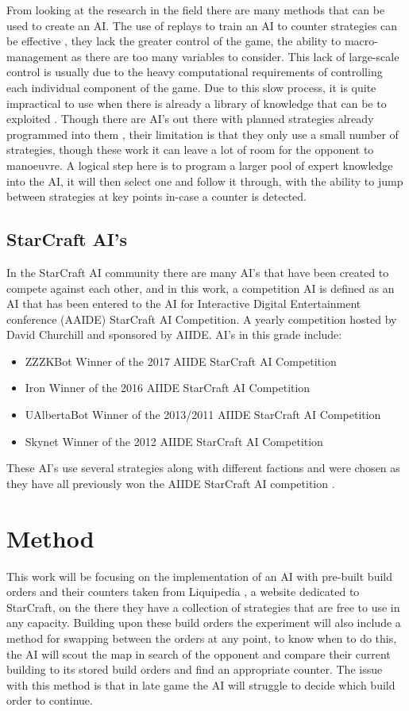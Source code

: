 \documentclass[journal]{IEEEtran}
\begin{document}
From looking at the research in the field there are many methods that can be used to create an AI. The use of replays to train an AI to counter strategies can be effective \cite{Bayesian}, they lack the greater control of the game, the ability to macro-management as there are too many variables to consider. This lack of large-scale control is usually due to the heavy computational requirements of controlling each individual component of the game.  Due to this slow process, it is quite impractical to use when there is already a library of knowledge that can be to exploited \cite{Liquid}. Though there are AI's out there with planned strategies already programmed into them \cite{ZZZK,Fuzzy}, their limitation is that they only use a small number of strategies, though these work it can leave a lot of room for the opponent to manoeuvre. A logical step here is to program a larger pool of expert knowledge into the AI, it will then select one and follow it through, with the ability to jump between strategies at key points in-case a counter is detected. 

\subsection{StarCraft AI's}
In the StarCraft AI community there are many AI's that have been created to compete against each other, and in this work, a competition AI is defined as an AI that has been entered to the AI for Interactive Digital Entertainment conference (AAIDE) StarCraft AI Competition. A yearly competition hosted by David Churchill and sponsored by AIIDE. AI's in this grade include:
\begin{itemize}
\item ZZZKBot Winner of the 2017 AIIDE StarCraft AI Competition \cite{ZZZK}
\item Iron Winner of the 2016 AIIDE StarCraft AI Competition \cite{Iron}
\item UAlbertaBot Winner of the 2013/2011 AIIDE StarCraft AI Competition \cite{UAlberta}
\item Skynet Winner of the 2012 AIIDE StarCraft AI Competition \cite{Skynet}
\end{itemize}

These AI's use several strategies along with different factions and were chosen as they have all previously won the AIIDE StarCraft AI competition \cite{Results}.

\section{Method}
This work will be focusing on the implementation of an AI with pre-built build orders and their counters taken from Liquipedia \cite{Liquid}, a website dedicated to StarCraft, on the there they have a collection of strategies that are free to use in any capacity. Building upon these build orders the experiment will also include a method for swapping between the orders at any point, to know when to do this, the AI will scout the map in search of the opponent and compare their current building to its stored build orders and find an appropriate counter. The issue with this method is that in late game the AI will struggle to decide which build order to continue. 
\end{document}
